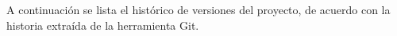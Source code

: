 A continuación se lista el histórico de versiones del proyecto, de acuerdo con la historia extraída de la herramienta Git.
\begin{flushleft}
    \begin{itemize}
        
    \end{itemize}
\end{flushleft}